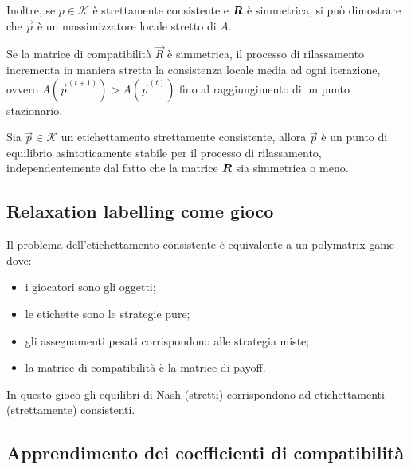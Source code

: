 \noindent Inoltre, se $p \in \mathcal{K}$ è strettamente consistente e $\mat{R}$ è simmetrica, si può dimostrare che $\vec{p}$ è un massimizzatore locale stretto di $A$.
\begin{thm}[M. Pelillo, 1997]
	Se la matrice di compatibilità $\vec{R}$ è simmetrica, il processo di rilassamento incrementa in maniera stretta la consistenza locale media ad ogni iterazione, ovvero $A(\vec{p}^{(t + 1)}) > A(\vec{p}^{(t)})$ fino al raggiungimento di un punto stazionario.
\end{thm}
\begin{thm}
	Sia $\vec{p} \in \mathcal{K}$ un etichettamento strettamente consistente, allora $\vec{p}$ è un punto di equilibrio asintoticamente stabile per il processo di rilassamento, independentemente dal fatto che la matrice $\mat{R}$ sia simmetrica o meno.
\end{thm}

\subsection{Relaxation labelling come gioco}

Il problema dell'etichettamento consistente è equivalente a un polymatrix game dove:
\begin{itemize}
	\item i giocatori sono gli oggetti;
	\item le etichette sono le strategie pure;
	\item gli assegnamenti pesati corrispondono alle strategia miste;
	\item la matrice di compatibilità è la matrice di payoff.
\end{itemize}
In questo gioco gli equilibri di Nash (stretti) corrispondono ad etichettamenti (strettamente) consistenti.

\subsection{Apprendimento dei coefficienti di compatibilità}

